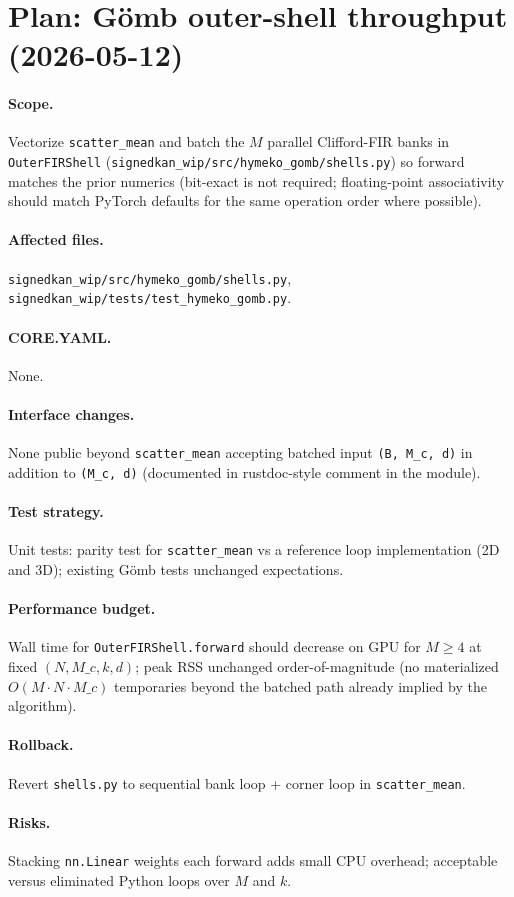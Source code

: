 \documentclass{article}
\begin{document}
\section*{Plan: G\"omb outer-shell throughput (2026-05-12)}

\paragraph{Scope.}
Vectorize \texttt{scatter\_mean} and batch the $M$ parallel Clifford-FIR banks in
\texttt{OuterFIRShell} (\texttt{signedkan\_wip/src/hymeko\_gomb/shells.py}) so forward
matches the prior numerics (bit-exact is not required; floating-point associativity
should match PyTorch defaults for the same operation order where possible).

\paragraph{Affected files.}
\texttt{signedkan\_wip/src/hymeko\_gomb/shells.py},
\texttt{signedkan\_wip/tests/test\_hymeko\_gomb.py}.

\paragraph{CORE.YAML.}
None.

\paragraph{Interface changes.}
None public beyond \texttt{scatter\_mean} accepting batched input
\texttt{(B, M\_c, d)} in addition to \texttt{(M\_c, d)} (documented in rustdoc-style
comment in the module).

\paragraph{Test strategy.}
Unit tests: parity test for \texttt{scatter\_mean} vs a reference loop implementation
(2D and 3D); existing G\"omb tests unchanged expectations.

\paragraph{Performance budget.}
Wall time for \texttt{OuterFIRShell.forward} should decrease on GPU for $M\ge 4$ at
fixed $(N,M\_c,k,d)$; peak RSS unchanged order-of-magnitude (no materialized
$O(M\cdot N\cdot M\_c)$ temporaries beyond the batched path already implied by the
algorithm).

\paragraph{Rollback.}
Revert \texttt{shells.py} to sequential bank loop + corner loop in
\texttt{scatter\_mean}.

\paragraph{Risks.}
Stacking \texttt{nn.Linear} weights each forward adds small CPU overhead; acceptable
versus eliminated Python loops over $M$ and $k$.
\end{document}
